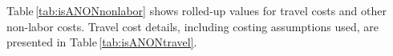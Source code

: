 \documentclass[usenames,dvipsnames,modern]{CLASS_FILES/aastex631}
\begin{document}
\def\BannerColor{Blue} %
\def\BannerFontColor{White} %
\def\BannerBoldface#1{\textbf{#1}} %
\def\CostLabelColor{Blue} %
\def\YearLabelColor{Blue} %
\def\TotalLabelColor{Blue} %
\def\ColumnBoldface#1{\textbf{#1}} %
\def\TotalBoldface#1{\textbf{#1}} %
\def\fmtA#1{\textbf{#1}} %
\def\fmtB#1{\textit{#1}} %
\def\fmtC#1{\textbf{#1}} %
\def\fmtD#1{\textit{#1}} %
\def\fmtE#1{\textbf{#1}} %
\def\fmtF#1{\textit{#1}} %
%
Table\,\ref{tab:isANONnonlabor} shows rolled-up values for travel costs and other non-labor costs. Travel cost details, including costing assumptions used, are presented in Table\,\ref{tab:isANONtravel}.
\end{document}
